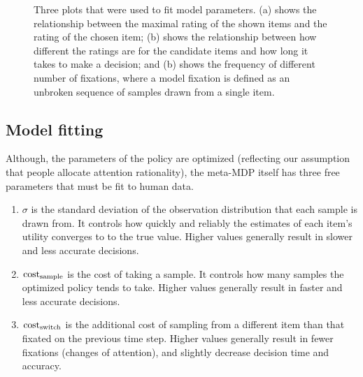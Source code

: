 \documentclass[12pt,a4paperpaper,]{article}
\begin{document}
\begin{figure}[ht!]
  \centering
  \caption{Three plots that were used to fit model parameters. (a) shows the relationship between the maximal rating of the shown items and the rating of the chosen item; (b) shows the relationship between how different the ratings are for the candidate items and how long it takes to make a decision; and (b) shows the frequency of different number of fixations, where a model fixation is defined as an unbroken sequence of samples drawn from a single item.}
  \label{fig:loss}
\end{figure}

\subsection{Model fitting}
Although, the parameters of the policy are optimized (reflecting our assumption that people allocate attention rationality), the meta-MDP itself has three free parameters that must be fit to human data.

\begin{enumerate}
  \item $\sigma$ is the standard deviation of the observation distribution that each sample is drawn from. It controls how quickly and reliably the estimates of each item's utility converges to to the true value. Higher values generally result in slower and less accurate decisions.
  \item $\text{cost}_\text{sample}$ is the cost of taking a sample. It controls how many samples the optimized policy tends to take. Higher values generally result in faster and less accurate decisions.
  \item $\text{cost}_\text{switch}$ is the additional cost of sampling from a different item than that fixated on the previous time step. Higher values generally result in fewer fixations (changes of attention), and slightly decrease decision time and accuracy.
\end{enumerate}
\end{document}
